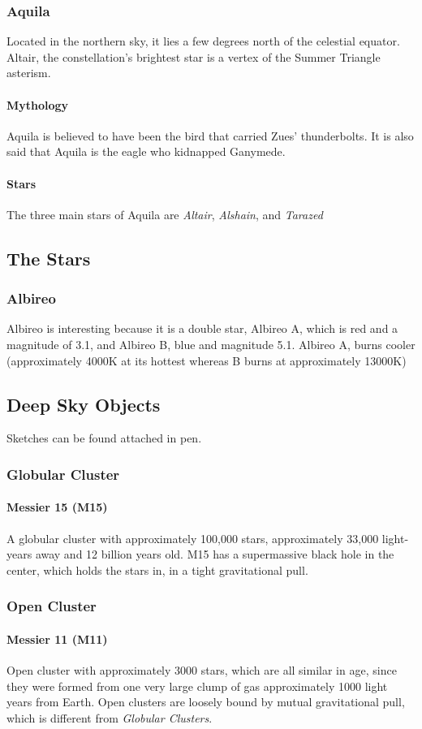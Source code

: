 \documentclass{article}
\begin{document}
\subsubsection{Aquila}
Located in the northern sky, it lies a few degrees north of the celestial equator.  Altair, the constellation's brightest star is a vertex of the Summer Triangle asterism.
\paragraph{Mythology}
Aquila is believed to have been the bird that carried Zues' thunderbolts.  It is also said that Aquila is the eagle who kidnapped Ganymede. 
\paragraph{Stars}
The three main stars of Aquila are \emph{Altair}, \emph{Alshain}, and \emph{Tarazed}
\subsection{The Stars}
\subsubsection{Albireo}
Albireo is interesting because it is a double star, Albireo A, which is red and a magnitude of 3.1, and Albireo B, blue and magnitude 5.1.  Albireo A, burns cooler (approximately 4000K at its hottest whereas B burns at approximately 13000K) 
\subsection{Deep Sky Objects}
Sketches can be found attached in pen.
\subsubsection{Globular Cluster}
\paragraph{Messier 15 (M15)}
A globular cluster with approximately 100,000 stars, approximately 33,000 light-years away and 12 billion years old.  M15 has a supermassive black hole in the center, which holds the stars in, in a tight gravitational pull.
\subsubsection{Open Cluster}
\paragraph{Messier 11 (M11)}
Open cluster with approximately 3000 stars, which are all similar in age, since they were formed from one very large clump of gas approximately 1000 light years from Earth.  Open clusters are loosely bound by mutual gravitational pull, which is different from \emph{Globular Clusters}.
\end{document}
